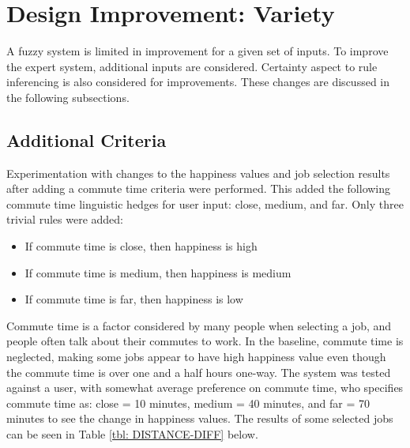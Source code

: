 \documentclass[12pt,fleqn,reqno,letterpaper]{article}
\begin{document}
\section{Design Improvement: Variety}
A fuzzy system is limited in improvement for a given set of inputs.  To improve the expert system, additional inputs are considered. Certainty aspect to rule inferencing is also considered for improvements. These changes are discussed in the following subsections.

\subsection{Additional Criteria}
Experimentation with changes to the happiness values and job selection results after adding a commute time criteria were performed. This added the following commute time linguistic hedges for user input: close, medium, and far. Only three trivial rules were added: \\
\begin{itemize}
\item If commute time is close, then happiness is high
\item If commute time is medium, then happiness is medium
\item If commute time is far, then happiness is low
\end{itemize}

Commute time is a factor considered by many people when selecting a job, and people often talk about their commutes to work. In the baseline, commute time is neglected, making some jobs appear to have high happiness value even though the commute time is over one and a half hours one-way.  The system was tested  against a user, with somewhat average preference on commute time, who specifies commute time as: close = 10 minutes, medium = 40 minutes, and far = 70 minutes to see the change in happiness values. The results of some selected jobs can be seen in Table \ref{tbl: DISTANCE-DIFF} below.
\end{document}
